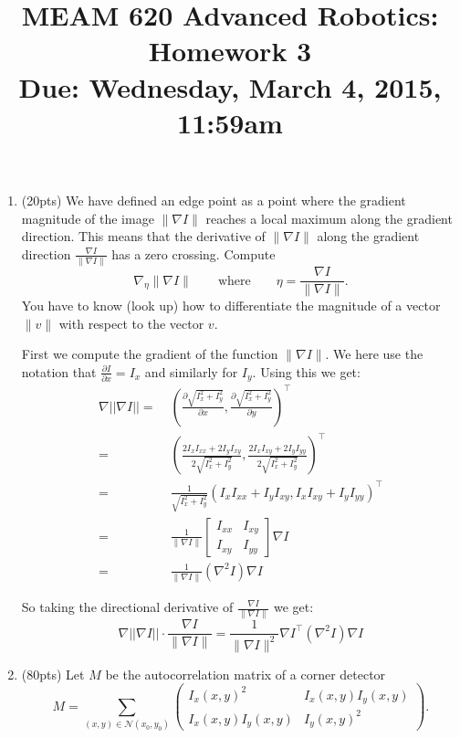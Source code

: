 \documentclass[11pt,english]{article}
\title{MEAM 620 Advanced Robotics: Homework 3\\
Due: Wednesday, March 4, 2015,  11:59am }
\author{}
\date{}
\begin{document}
\maketitle
\begin{enumerate}
\item
(20pts) We have defined an edge point as a point where the gradient magnitude of the image $\| \nabla I \| $ reaches a local maximum along the gradient direction. This means that the derivative of $\| \nabla I \| $ along the gradient direction $\frac{\nabla I}{\| \nabla I \|}$ has a zero crossing. Compute 
\[
\nabla_\eta \| \nabla I \|
\qquad \mbox{where} \qquad  \eta = \frac{\nabla I}{\| \nabla I \|} .
\]
You have to know (look up) how to differentiate the magnitude of a vector $\| v \|$ with respect to the vector $v$. 

First we compute the gradient of the function $\|\nabla I\|$. We here use the notation that $\frac{\partial I}{\partial x} = I_x$ and
similarly for $I_y$. Using this we get:
\begin{align*}
    \nabla ||\nabla I|| 
    =&\; \left(\frac{\partial \sqrt{I_x^2 + I_y^2 }}{\partial x}, \frac{\partial \sqrt{I_x^2 + I_y^2}}{\partial y} \right)^\top \\
    =&\; \left(\frac{2I_x I_{xx}+2I_y I_{xy}}{2\sqrt{I_x^2+I_y^2}},\frac{2I_x I_{xy}+2I_y I_{yy}}{2\sqrt{I_x^2+I_y^2}}\right)^\top \\
    =&\; \frac{1}{\sqrt{I_x^2+I_y^2}} \left(I_x I_{xx}+I_y I_{xy},I_x I_{xy}+I_y I_{yy}\right)^\top \\
    =&\; \frac{1}{\|\nabla I\|} 
            \begin{bmatrix}
                I_{xx} & I_{xy} \\
                I_{xy} & I_{yy}
            \end{bmatrix} \nabla I \\
    =&\; \frac{1}{\|\nabla I\|} \left( \nabla^2 I\right) \nabla I
\end{align*}

So taking the directional derivative of $\frac{\nabla I}{\|\nabla I\|}$ we get:
\[ \nabla ||\nabla I|| \cdot \frac{\nabla I}{\|\nabla I\|} = \frac{1}{\|\nabla I\|^2} \nabla I^\top \left( \nabla^2 I\right) \nabla I \]

\item
(80pts)
Let $M$ be the autocorrelation matrix of a corner detector 
\[
M = \sum_{(x,y)\in \mathcal{N}(x_0,y_0)}  \begin{pmatrix}
I_x(x,y)^2 & I_x(x,y) I_y(x,y) \\ I_x(x,y) I_y(x,y) & I_y(x,y)^2\end{pmatrix}  .
\]


\end{enumerate}
\end{document}
